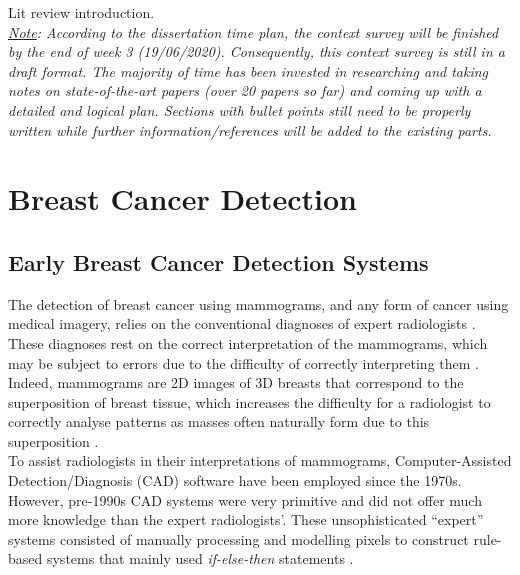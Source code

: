 Lit review introduction.\\

\textit{\underline{Note}: According to the dissertation time plan, the context survey will be finished by the end of week 3 (19/06/2020). Consequently, this context survey is still in a draft format. The majority of time has been invested in researching and taking notes on state-of-the-art papers (over 20 papers so far) and coming up with a detailed and logical plan. Sections with bullet points still need to be properly written while further information/references will be added to the existing parts.}


\section{Breast Cancer Detection}

\subsection{Early Breast Cancer Detection Systems}


The detection of breast cancer using mammograms, and any form of cancer using medical imagery, relies on the conventional diagnoses of expert radiologists \cite{Osareh2010}. These diagnoses rest on the correct interpretation of the mammograms, which may be subject to errors due to the difficulty of correctly interpreting them \cite{Elter2009}. Indeed, mammograms are 2D images of 3D breasts that correspond to the superposition of breast tissue, which increases the difficulty for a radiologist to correctly analyse patterns as masses often naturally form due to this superposition \cite{Elter2009}.\\

To assist radiologists in their interpretations of mammograms, Computer-Assisted Detection/Diagnosis (CAD) software have been employed since the 1970s. However, pre-1990s CAD systems were very primitive and did not offer much more knowledge than the expert radiologists'. These unsophisticated ``expert'' systems consisted of manually processing and modelling pixels to construct rule-based systems that mainly used \textit{if-else-then} statements \cite{Litjens2017}.

